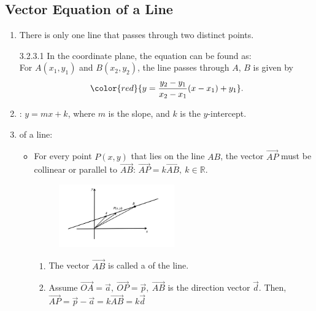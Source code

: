 \documentclass[12pt, a4paper]{article}
\begin{document}
\subsection{Vector Equation of a Line}
\begin{enumerate}
  \item There is only one line that passes through two distinct points. 
  \begin{theorem}{3.2.3.1}{}
  In the coordinate plane, the equation can be found as: \\
  For $A(x_1,y_1)$ and $B(x_2,y_2)$, the line passes through $A$, $B$ is given by $${\color{red}{y=\frac{y_2-y_1}{x_2-x_1}(x-x_1)+y_1}}.$$
  \end{theorem}
  \item {}: $y=mx+k$, where $m$ is the slope, and $k$ is the $y$-intercept.\\
  {}
  \item \textbf{\color{red}{Vector form}} of a line: 
  \begin{itemize}
    \item For every point $P(x,y)$ that lies on the line $AB$, the vector $\overrightarrow{AP}$ must be collinear or parallel to $\overrightarrow{AB}$: $\overrightarrow{AP}=k\overrightarrow{AB},\ k\in\mathbb{R}$.
    \begin{figure}[H]
      \centering
      \includegraphics[width=0.5\textwidth]{Fig.3.8.jpg}
    \end{figure}
    \begin{enumerate}
      \item The vector $\overrightarrow{AB}$ is called a \textbf{\color{red}{direction vector}} of the line. \\
      {}
      \item Assume $\overrightarrow{OA}=\vec{a},\ \overrightarrow{OP}=\vec{p},\ \overrightarrow{AB}$ is the direction vector $\vec{d}$. Then, $\overrightarrow{AP}=\vec{p}-\vec{a}=k\overrightarrow{AB}=k\vec{d}$

\end{enumerate}
\end{itemize}
\end{enumerate}
\end{document}
